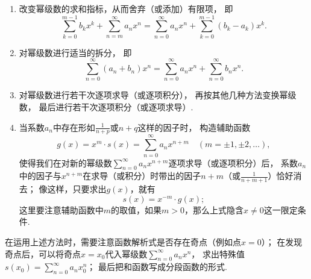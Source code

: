 \begin{enumerate}
\begin{enumerate}
		\item 改变幂级数的求和指标，从而舍弃（或添加）有限项，
		即\[
			\sum_{k=0}^{m-1} b_k x^k + \sum_{n=m}^\infty a_n x^n
			= \sum_{n=0}^\infty a_n x^n + \sum_{k=0}^{m-1} (b_k-a_k) x^k.
		\]

		\item 对幂级数进行适当的拆分，
		即\[
			\sum_{n=0}^\infty (a_n + b_n) x^n
			= \sum_{n=0}^\infty a_n x^n
			+ \sum_{n=0}^\infty b_n x^n.
		\]

		\item 对幂级数进行若干次逐项求导（或逐项积分），
		再按其他几种方法变换幂级数，
		最后进行若干次逐项积分（或逐项求导）.

		\item 当系数\(a_n\)中存在形如\(\frac{1}{n+p}\)或\(n+q\)这样的因子时，
		构造辅助函数\[
			g(x) = x^m \cdot s(x) = \sum_{n=0}^\infty a_n x^{n+m}
			\quad(m=\pm1,\pm2,\dotsc),
		\]
		使得我们在对新的幂级数\(\sum_{n=0}^\infty a_n x^{n+m}\)逐项求导（或逐项积分）后，
		系数\(a_n\)中的因子与\(x^{n+m}\)在求导（或积分）时带出的因子\(n+m\)（或\(\frac{1}{n+m+1}\)）恰好消去；
		像这样，只要求出\(g(x)\)，就有\[
			s(x) = x^{-m} \cdot g(x);
		\]
		这里要注意辅助函数中\(m\)的取值，如果\(m>0\)，那么上式隐含\(x\neq0\)这一限定条件.
	\end{enumerate}
	在运用上述方法时，需要注意函数解析式是否存在奇点（例如点\(x=0\)）；
	在发现奇点后，可以将奇点\(x=x_0\)代入幂级数\(\sum_{n=0}^\infty a_n x^n\)，
	求出特殊值\(s(x_0) = \sum_{n=0}^\infty a_n x_0^n\)；
	最后把和函数写成分段函数的形式.
\end{enumerate}

